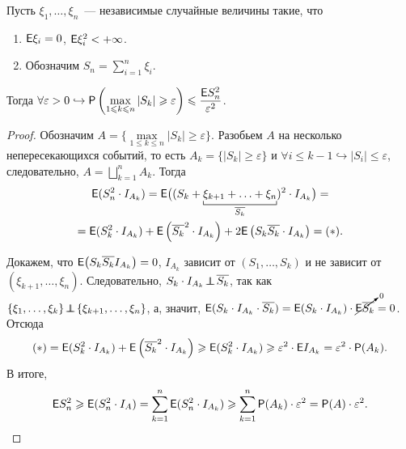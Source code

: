 \begin{theorem}
	Пусть $\xi_1,  \ldots, \xi_n$~--- независимые случайные величины такие, что
	\begin{enumerate}
	    \item $\mathsf{E} \xi_i = 0$, $\mathsf{E} \xi_i^2 < +\infty$.
	    \item Обозначим $S_n = \sum\limits_{i = 1}^n \xi_i$.
	\end{enumerate}  
	
	Тогда $\forall \varepsilon > 0 \hookrightarrow \mathsf{P} \left( \max\limits_{1 \leqslant k \leqslant n} |S_k| \geqslant \varepsilon \right) \leqslant \dfrac{\mathsf{E} S_n^2}{\varepsilon^2}$.
	\begin{proof}
		Обозначим $A = \{ \max\limits_{1 \leqslant k \leqslant n} |S_k| \geqslant \varepsilon \}$. Разобьем $A$ на несколько непересекающихся событий, то есть $A_k = \big\{ |S_k| \geqslant \varepsilon\big\}$ и $\forall i \leqslant k - 1 \hookrightarrow |S_i| \leqslant \varepsilon$, следовательно, $A = \bigsqcup\limits_{k=1}^{n} A_k$. Тогда
		\begin{multline*}
			\E(S_n^2 \cdot I_{A_k}) = \E\big( (S_k + \underbracket[0.5pt]{\xi_{k+1} + \ldots + \xi_n}_{\overline{S_k}} )^2 \cdot I_{A_k} \big) =  \\= \E( S_k^2 \cdot I_{A_k} ) + \E\left( \overline{S_k}^2 \cdot I_{A_k} \right) + 2 \E\left( S_k \overline{S_k} \cdot I_{A_k} \right) = (*).
		\end{multline*}
		
		Докажем, что $\mathsf{E} \big(S_k\overline{S_k}I_{A_k} \big) = 0$, $I_{A_k}$ зависит от $(S_1, \dots, S_k)$ и не зависит от $(\xi_{k+1}, \dots, \xi_n)$.
		Следовательно, $S_k \cdot I_{A_k} \!\perp\!\!\!\!\perp\! \overline{S_k}$, так как $\{\xi_1, \ldots, \xi_k \} \!\perp\!\!\!\!\perp\! \{ \xi_{k+1}, \ldots,\xi_n \}$, а, значит, $\mathsf{E}( S_k \cdot I_{A_k} \cdot \overline{S_k} ) = \mathsf{E}(S_k \cdot I_{A_k}) \cdot \cancelto{0}{\mathsf{E} \overline{S_k}} = 0$. Отсюда
		\begin{equation*}
			(*) = \mathsf{E}( S_k^2 \cdot I_{A_k} ) + \mathsf{E} \left( \overline{S_k}^2 \cdot I_{A_k}  \right) \geqslant \mathsf{E}(S_k^2 \cdot I_{A_k} ) \geqslant \varepsilon^2 \cdot \mathsf{E} I_{A_k} = \varepsilon^2 \cdot \mathsf{P}(A_k).
		\end{equation*}
		В итоге, 
		\begin{equation*}
			\mathsf{E} S_n^2 \geqslant \mathsf{E}( S_n^2 \cdot I_A ) = \sum\limits_{k = 1}^n \mathsf{E}( S_n^2 \cdot I_{A_k} ) \geqslant \sum\limits_{k = 1}^n \mathsf{P}(A_k) \cdot \varepsilon^2 = \mathsf{P}(A) \cdot \varepsilon^2.
		\end{equation*}
	\end{proof}
\end{theorem}

